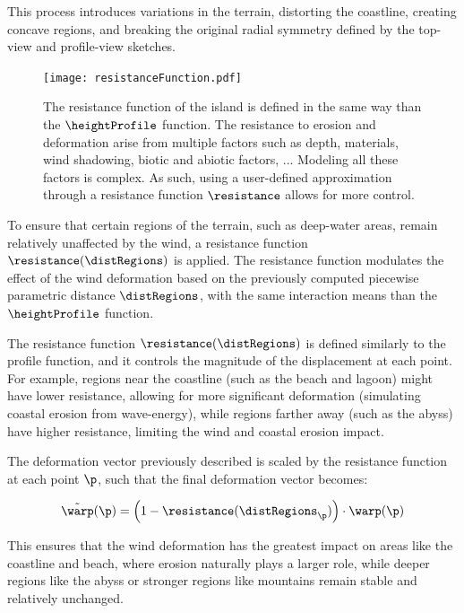 This process introduces variations in the terrain, distorting the coastline, creating concave regions, and breaking the original radial symmetry defined by the top-view and profile-view sketches.


\begin{figure}[H]
	\centering
	\texttt{[image: resistanceFunction.pdf]}
    \caption{The resistance function of the island is defined in the same way than the $\heightProfile$ function. The resistance to erosion and deformation arise from multiple factors such as depth, materials, wind shadowing, biotic and abiotic factors, ... Modeling all these factors is complex. As such, using a user-defined approximation through a resistance function $\resistance$ allows for more control. }
    \label{fig:coral-island_resistance-function}
\end{figure}

To ensure that certain regions of the terrain, such as deep-water areas, remain relatively unaffected by the wind, a resistance function $\resistance(\distRegions)$ is applied. The resistance function modulates the effect of the wind deformation based on the previously computed piecewise parametric distance $\distRegions$, with the same interaction means than the $\heightProfile$ function.

The resistance function $\resistance(\distRegions)$ is defined similarly to the profile function, and it controls the magnitude of the displacement at each point. For example, regions near the coastline (such as the beach and lagoon) might have lower resistance, allowing for more significant deformation (simulating coastal erosion from wave-energy), while regions farther away (such as the abyss) have higher resistance, limiting the wind and coastal erosion impact.

The deformation vector previously described is scaled by the resistance function at each point $\p$, such that the final deformation vector becomes:

\begin{align}
    \Tilde{\warp}(\p) = \left(1 - \resistance(\distRegions_\p) \right) \cdot \warp(\p)
\end{align}

This ensures that the wind deformation has the greatest impact on areas like the coastline and beach, where erosion naturally plays a larger role, while deeper regions like the abyss or stronger regions like mountains remain stable and relatively unchanged.

